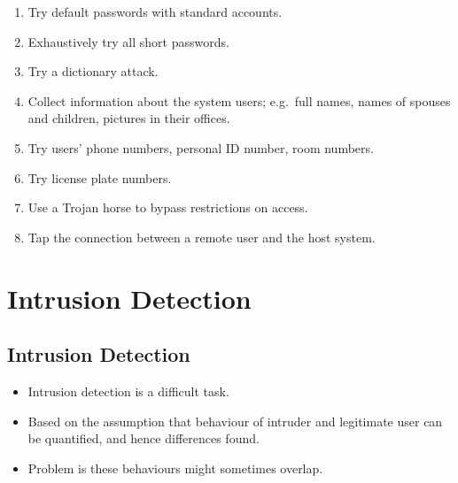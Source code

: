 \documentclass{beamer}
\begin{document}
\begin{frame}{\insertsubsectionhead}
  \begin{enumerate}
    \item Try default passwords with standard accounts.
    \item Exhaustively try all short passwords.
    \item Try a dictionary attack.
    \item Collect information about the system users; e.g.\ full names, names 
      of spouses and children, pictures in their offices.
    \item Try users' phone numbers, personal ID number, room numbers.
    \item Try license plate numbers.
    \item Use a Trojan horse to bypass restrictions on access.
    \item Tap the connection between a remote user and the host system.
  \end{enumerate}
\end{frame}


\section{Intrusion Detection}

\subsection{Intrusion Detection}

\begin{frame}{\insertsubsectionhead}
  \begin{itemize}
    \item Intrusion detection is a difficult task.

    \item Based on the assumption that behaviour of intruder and legitimate 
      user can be quantified, and hence differences found.

    \item Problem is these behaviours might sometimes overlap.

  \end{itemize}
\end{frame}
\end{document}
